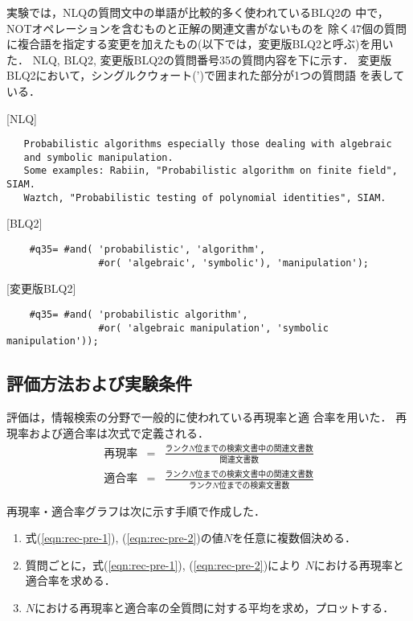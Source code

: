   実験では，{\small NLQ}の質問文中の単語が比較的多く使われている{\small BLQ2}の
中で，{\small NOT}オペレーションを含むものと正解の関連文書がないものを
除く47個の質問に複合語を指定する変更を加えたもの(以下では，変更版{\small BLQ2}と呼ぶ)を用いた．
  {\small NLQ}, {\small BLQ2}, 変更版{\small BLQ2}の質問番号35の質問内容を下に示す．
  変更版{\small BLQ2}において，シングルクウォート(')で囲まれた部分が1つの質問語
を表している．

{
\parindent=0mm
[NLQ]
\begin{verbatim}
   Probabilistic algorithms especially those dealing with algebraic
   and symbolic manipulation.
   Some examples: Rabiin, "Probabilistic algorithm on finite field", SIAM.
   Waztch, "Probabilistic testing of polynomial identities", SIAM.
\end{verbatim}
[BLQ2]
\begin{verbatim}
    #q35= #and( 'probabilistic', 'algorithm',
                #or( 'algebraic', 'symbolic'), 'manipulation');
\end{verbatim}
[変更版BLQ2]
\begin{verbatim}
    #q35= #and( 'probabilistic algorithm',
                #or( 'algebraic manipulation', 'symbolic manipulation'));
\end{verbatim}
}


\subsection{評価方法および実験条件}\label{sec:evaluation}
  評価は，情報検索の分野で一般的に使われている{\dg 再現率}と{\dg 適
合率}を用いた．
  再現率および適合率は次式で定義される．
\begin{eqnarray}
 再現率 & = & \frac{ランクN位までの検索文書中の関連文書数}{関連文書数}\label{eqn:rec-pre-1}\\[1ex]
 適合率 & = & \frac{ランクN位までの検索文書中の関連文書数}{ランクN位までの検索文書数}\label{eqn:rec-pre-2}
\end{eqnarray}

再現率・適合率グラフは次に示す手順で作成した．

\begin{enumerate}
 \item 式(\ref{eqn:rec-pre-1}), (\ref{eqn:rec-pre-2})の値$N$を任意に複数個決める．
 \item 質問ごとに，式(\ref{eqn:rec-pre-1}), (\ref{eqn:rec-pre-2})により
       $N$における再現率と適合率を求める．
 \item $N$における再現率と適合率の全質問に対する平均を求め，プロットする．
\end{enumerate}

